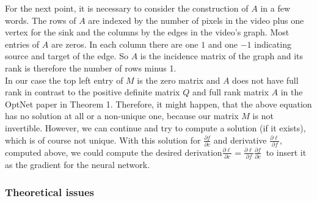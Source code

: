 \documentclass{article}
\begin{document}
{For the next point, it is necessary to consider the construction of $A$ in a few words. The rows of $A$ are indexed by the number of pixels in the video plus one vertex for the sink and the columns by the edges in the video's graph. Most entries of $A$ are zeros. In each column there are one $1$ and one $-1$ indicating source and target of the edge. So $A$ is the incidence matrix of the graph and its rank is therefore the number of rows minus 1.\\
In our case the top left entry of $M$ is the zero matrix and $A$ does not have full rank in contrast to the positive definite matrix $Q$ and full rank matrix $A$ in the OptNet paper in Theorem 1. Therefore, it might happen, that the above equation has no solution at all or a non-unique one, because our matrix $M$ is not invertible. However, we can continue and try to compute a solution (if it exists), which is of course not unique. With this solution for $\frac{\partial f}{\partial c}$ and derivative $\frac{\partial \ell}{\partial f}$, computed above, we could compute the desired derivation$\frac{\partial \ell }{\partial c} = \frac{\partial \ell}{\partial f} \frac{\partial f}{\partial c}~
$ to insert it as the gradient for the neural network. 

\subsubsection{Theoretical issues}

}
\end{document}
